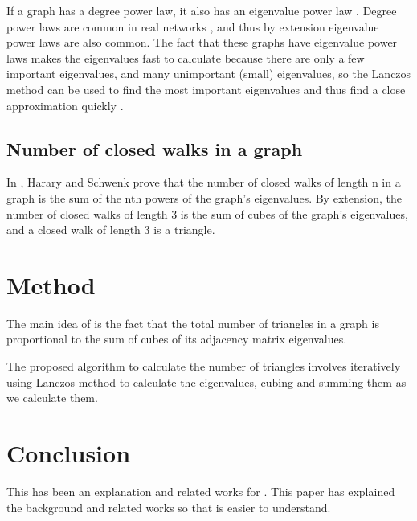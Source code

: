 \documentclass{acm_proc_article-sp}
\begin{document}
If a graph has a degree power law, it also has an eigenvalue power law
\cite{mihail}. Degree power laws are common in real networks \cite{original},
and thus by extension eigenvalue power laws are also common. The fact that
these graphs have eigenvalue power laws makes the eigenvalues fast to calculate
because there are only a few important eigenvalues, and many unimportant
(small) eigenvalues, so the Lanczos method can be used to find the most
important eigenvalues and thus find a close approximation quickly \cite{original}.

\subsection{Number of closed walks in a graph}
In \cite{harary}, Harary and Schwenk prove that the number of closed walks of
length n in a graph is the sum of the nth powers of the graph's eigenvalues. By
extension, the number of closed walks of length 3 is the sum of cubes of the
graph's eigenvalues, and a closed walk of length 3 is a triangle.

\section{Method}
The main idea of \cite{original} is the fact that the total number of triangles
in a graph is proportional to the sum of cubes of its adjacency matrix
eigenvalues.

The proposed algorithm to calculate the number of triangles involves
iteratively using Lanczos method to calculate the eigenvalues, cubing and
summing them as we calculate them.

\section{Conclusion}
This has been an explanation and related works for \cite{original}. This paper
has explained the background and related works so that \cite{original} is
easier to understand.

%

%
%
\end{document}
